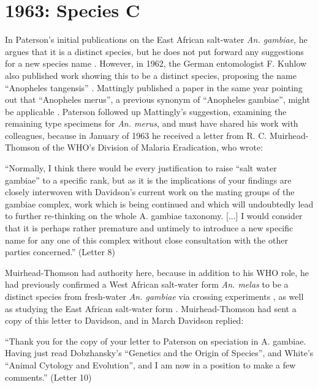 \documentclass[a4paper,11pt,abstracton,hidelinks]{scrartcl}
\begin{document}
\section{1963: Species C}


In Paterson's initial publications on the East African salt-water \textit{An. gambiae}, he argues that it is a distinct species, but he does not put forward any suggestions for a new species name \citep{Paterson1962a,Paterson1962b}. 
However, in 1962, the German entomologist F. Kuhlow also published work showing this to be a distinct species, proposing the name ``Anopheles tangensis'' \citep{Kuhlow1962}. 
Mattingly published a paper in the same year pointing out that ``Anopheles merus'', a previous synonym of ``Anopheles gambiae'', might be applicable \citep{Mattingly1962}. 
Paterson followed up Mattingly's suggestion, examining the remaining type specimens for \textit{An. merus}, and must have shared his work with colleagues, because in January of 1963 he received a letter from R. C. Muirhead-Thomson of the WHO's Division of Malaria Eradication, who wrote:

\begin{displayquote}
``Normally, I think there would be every justification to raise ``salt water gambiae'' to a specific rank, but as it is the implications of your findings are closely interwoven with Davidson's current work on the mating groups of the gambiae complex, work which is being continued and which will undoubtedly lead to further re-thinking on the whole A. gambiae taxonomy. [...] I would consider that it is perhaps rather premature and untimely to introduce a new specific name for any one of this complex without close consultation with the other parties concerned.'' (Letter 8)
\end{displayquote}

Muirhead-Thomson had authority here, because in addition to his WHO role, he had previously confirmed a West African salt-water form \textit{An. melas} to be a distinct species from fresh-water \textit{An. gambiae} via crossing experiments \citep{MuirheadThomson1948}, as well as studying the East African salt-water form \citep{MuirheadThomson1951}. Muirhead-Thomson had sent a copy of this letter to Davidson, and in March Davidson replied:

\begin{displayquote}
``Thank you for the copy of your letter to Paterson on speciation in A. gambiae. Having just read Dobzhansky's ``Genetics and the Origin of Species'', and White's ``Animal Cytology and Evolution'', and I am now in a position to make a few comments.'' (Letter 10)
\end{displayquote}
\end{document}
